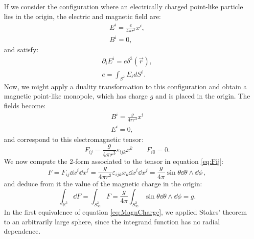 \documentclass[main.tex]{subfiles}
\begin{document}
%
If we consider the configuration where an electrically charged point-like particle lies in the origin, the electric and magnetic field are:
\begin{subequations}\label{ElectricMonopole}
\begin{gather}
E^i=\frac{e}{4\pi r^3}x^i,\\
B^i =0,
\end{gather}
\end{subequations}
%
and satisfy:
%
\begin{subequations}
\begin{align}
\partial_i E^i= e \delta^3(\vec r),\\
e=\int_{S^2} E_i d S^i.
\end{align}
\end{subequations}
%
Now, we might apply a duality transformation to this configuration and obtain a magnetic point-like monopole, which has charge $g$ and is placed in the origin. The fields become:
%
\begin{subequations}
\begin{gather}
\label{MagneticMonopole}
B^i=\frac{g}{4\pi r^3}x^i\\
E^i=0,
\end{gather}
\end{subequations}
%
and correspond to this electromagnetic tensor:
\begin{equation}\label{eq:Fij}
F_{ij}=\frac{g}{4 \pi r^3}\varepsilon_{ijk}x^k \qquad F_{i0}=0.
\end{equation}
%
We now compute the 2-form associated to the tensor in equation \eqref{eq:Fij}:
%
\begin{equation}
F=F_{ij}\dd{x^i}\dd{x^j}=\frac{g}{4\pi r^3}\varepsilon_{ijk}x_k\dd{x^i}\dd{x^j}=\frac{g}{4\pi}\sin\theta \dd{\theta}\wedge \dd{\phi}\,,
\end{equation}
%
and deduce from it the value of the magnetic charge in the origin:
%
\begin{equation} \label{eq:MagnCharge}
\int_{\mathbb R^3} \dd{F} = \int_{S^2_\infty} F=\frac{g}{4\pi}\int_{S^2_\infty}\sin\theta \dd{\theta}\wedge \dd{\phi}=g .
\end{equation}
%
In the first equivalence of equation \eqref{eq:MagnCharge}, we applied Stokes' theorem to an arbitrarily large sphere, since the integrand function has no radial dependence.
\end{document}
